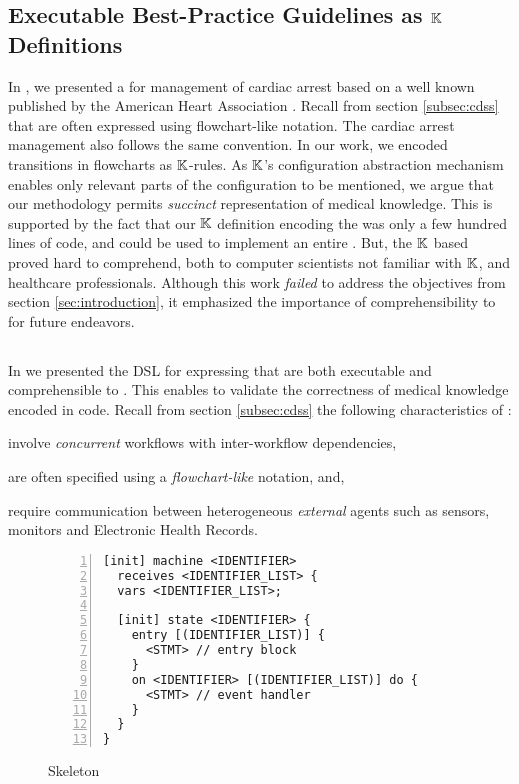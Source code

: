 \subsection{Executable Best-Practice Guidelines as $\mathbb{K}$ Definitions}\label{subsec:BPG-in-K}

In \cite{Saxena22TR}, we presented a \CDSS{} for management of
cardiac arrest based on a well known \BPG{} published by the American Heart
Association \cite{AHAUrl}. Recall from section \ref{subsec:cdss} that
\BPGs{} are often expressed using flowchart-like notation. The cardiac arrest
management \BPG{} also follows the same convention. In our work, we encoded
transitions in \BPG{} flowcharts as $\mathbb{K}$-rules. As $\mathbb{K}$'s
configuration abstraction mechanism enables only relevant parts of the
configuration to be mentioned, we argue that our methodology permits
\emph{succinct} representation of medical knowledge. This is supported by
the fact that our $\mathbb{K}$ definition encoding the \BPG was only a few hundred lines of
code, and could be used to implement an entire \CDSS{}. But, the $\mathbb{K}$ based
\BPG{} proved hard to comprehend, both to computer scientists not familiar with
$\mathbb{K}$, and healthcare professionals. Although this work \emph{failed} to address
the objectives from section \ref{sec:introduction}, it emphasized the importance
of comprehensibility to \HCPs{} for future endeavors.

\subsection{\MediK{}}\label{subsec:medik}

In \cite{SaxenaFMCAD23} we presented the \MediK{} DSL for expressing
\BPGs{} that are both executable and comprehensible to \HCPs{}. This
enables \HCPs{} to validate the correctness of medical knowledge encoded
in \MediK{} code. Recall from section \ref{subsec:cdss} the following
characteristics of \BPGs{}:
\begin{enumerate*}[label=(\alph*)]
  \item involve \emph{concurrent} workflows with inter-workflow dependencies,
  \item are often specified using a \emph{flowchart-like} notation, and,
  \item require communication between heterogeneous \emph{external} agents such
    as sensors, monitors and Electronic Health Records.
\end{enumerate*}

\begin{wrapfigure}{l}{0.45\textwidth}
    \caption{\MediK{} \FSM{} Skeleton}\label{fig:medik-skeleton}
\begin{lstlisting}[style=mediksty
,language=medik
,basicstyle=\ttfamily\notsotiny
,numbers=left
,numberstyle=\tiny
,framexleftmargin=1.5em
,xleftmargin=2em
]
[init] machine <IDENTIFIER>
  receives <IDENTIFIER_LIST> {
  vars <IDENTIFIER_LIST>;

  [init] state <IDENTIFIER> {
    entry [(IDENTIFIER_LIST)] {
      <STMT> // entry block
    }
    on <IDENTIFIER> [(IDENTIFIER_LIST)] do {
      <STMT> // event handler
    }
  }
}
\end{lstlisting}
\end{wrapfigure}

